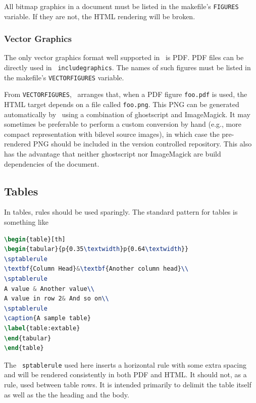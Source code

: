 \documentclass[11pt,a4paper]{ivoa}
\newcommand{\texword}[1]{\texttt{\color{texcolor} #1}}
\begin{document}
All bitmap graphics in a document must  be listed in the makefile's
\texttt{FIGURES} variable.  If they are not, the HTML rendering will be
broken.

\subsubsection{Vector Graphics}
\label{sect:vectorgraphics}

The only vector graphics format well supported in \ivoatex\ is PDF.  PDF
files can be directly used in \texword{includegraphics}.  The names of
such figures must be listed in the makefile's \texttt{VECTORFIGURES}
variable.

From \texttt{VECTORFIGURES}, \ivoatex\ arranges that, when a PDF figure
\texttt{foo.pdf} is used, the HTML target depends on a file called
\texttt{foo.png}.  This PNG can be generated automatically by
\ivoatex\ using a combination of ghostscript and ImageMagick.  It may
sometimes be preferable to perform a custom conversion by hand (e.g.,
more compact representation with bilevel source images), in which case
the pre-rendered PNG should be included in the version controlled
repository.  This also
has the advantage that neither ghostscript nor ImageMagick are build
dependencies of the document.

\subsection{Tables}

In tables, rules should be used sparingly.  The standard pattern for tables is
something like
\begin{lstlisting}[language=tex]
\begin{table}[th]
\begin{tabular}{p{0.35\textwidth}p{0.64\textwidth}}
\sptablerule
\textbf{Column Head}&\textbf{Another column head}\\
\sptablerule
A value & Another value\\
A value in row 2& And so on\\
\sptablerule
\caption{A sample table}
\label{table:extable}
\end{tabular}
\end{table}
\end{lstlisting}

The \texword{sptablerule} used here inserts a horizontal rule with some
extra spacing and will be rendered consistently in both PDF and HTML.
It should not, as a rule, used between table rows. It is intended
primarily to delimit the table itself as well as the the heading and the
body.
\end{document}
